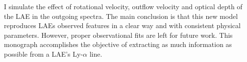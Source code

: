 \documentclass[11pt,a4paper]{article}
\begin{document}
I simulate the effect of rotational velocity, outflow velocity and optical depth of the LAE in the outgoing spectra. The main conclusion is that this new model reproduces LAEs observed features in a clear way and with consistent physical parameters. However, proper observational fits are left for future work. This monograph accomplishes the objective of extracting as much information as possible from a LAE's Ly-$\alpha$ line.





\end{document}

